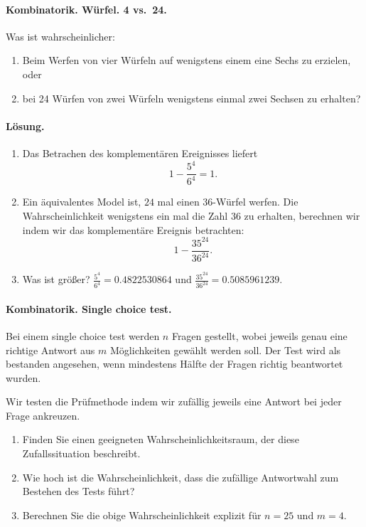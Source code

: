 \paragraph{Kombinatorik. Würfel. 4 vs.~24.}
Was ist wahrscheinlicher:
\begin{enumerate}
    \item Beim Werfen von vier Würfeln auf wenigstens einem eine Sechs zu
        erzielen, oder
    \item bei 24 Würfen von zwei Würfeln wenigstens einmal zwei Sechsen zu
        erhalten?
\end{enumerate}

\paragraph*{Lösung.}
\begin{enumerate}
    \item Das Betrachen des komplementären Ereignisses liefert
        \begin{equation}
            1 - \frac{5^4}{6^4} = 1.
            \label{}
        \end{equation}
    \item Ein äquivalentes Model ist, $24$ mal einen $36$-Würfel werfen. Die
        Wahrscheinlichkeit wenigstens ein mal die Zahl $36$ zu erhalten,
        berechnen wir indem wir das komplementäre Ereignis betrachten:
        \begin{equation} 
            1 - \frac{35^{24}}{36^{24}}.  
        \end{equation}
    \item Was ist größer? $\frac{5^4}{6^4} = 0.4822530864$ und
        $\frac{35^{24}}{36^{24}} = 0.5085961239$.
\end{enumerate}




\paragraph{Kombinatorik. Single choice test.} Bei einem single choice test
werden $n$ Fragen gestellt, wobei jeweils genau eine richtige Antwort aus $m$
Möglichkeiten gewählt werden soll. Der Test wird als bestanden angesehen, wenn
mindestens Hälfte der Fragen richtig beantwortet wurden.

Wir testen die Prüfmethode indem wir zufällig jeweils eine Antwort bei jeder Frage
ankreuzen. 
\begin{enumerate}
    \item Finden Sie einen geeigneten Wahrscheinlichkeitsraum, der diese
        Zufallssituation \linebreak beschreibt.
    \item Wie hoch ist die Wahrscheinlichkeit, dass die zufällige Antwortwahl zum 
        Bestehen des Tests führt?
    \item Berechnen Sie die obige Wahrscheinlichkeit explizit für $n=25$ und $m=4$.
\end{enumerate}


